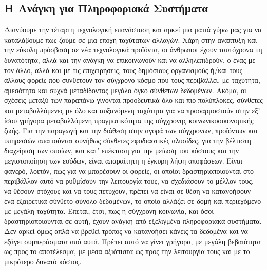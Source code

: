\documentclass{article}
\begin{document}
\subsection{Η Ανάγκη για Πληροφοριακά Συστήματα}
Διανύουμε την τέταρτη τεχνολογική επανάσταση και αρκεί μια ματιά γύρω μας για να καταλάβουμε πως ζούμε σε μια εποχή ταχύτατων αλλαγών. Χάρη στην ανάπτυξη και την εύκολη πρόσβαση σε νέα τεχνολογικά προϊόντα, οι άνθρωποι έχουν ταυτόχρονα τη δυνατότητα, αλλά και την ανάγκη να επικοινωνούν και να αλληλεπιδρούν, ο ένας με τον άλλο, αλλά και με τις επιχειρήσεις, τους δημόσιους οργανισμούς ή/και τους άλλους φορείς που συνθέτουν τον σύγχρονο κόσμο που τους περιβάλλει, με ταχύτητα, αμεσότητα και συχνά μεταδίδοντας μεγάλο όγκο σύνθετων δεδομένων. Ακόμα, οι σχέσεις μεταξύ των παραπάνω γίνονται προοδευτικά όλο και πιο πολύπλοκες, σύνθετες και μεταβαλλόμενες με όλο και αυξανόμενη ταχύτητα για να προσαρμοστούν στην εξ’ ίσου γρήγορα μεταβαλλόμενη πραγματικότητα της σύγχρονης κοινωνικοοικονομικής ζωής. Για την παραγωγή και την διάθεση στην αγορά των σύγχρονων, προϊόντων και υπηρεσιών απαιτούνται συνήθως σύνθετες εφοδιαστικές αλυσίδες, για την βέλτιστη διαχείριση των οποίων, και κατ’ επέκταση για την μείωση του κόστους και την μεγιστοποίηση των εσόδων, είναι απαραίτητη η έγκυρη λήψη αποφάσεων. Είναι φανερό, λοιπόν, πως για να μπορέσουν οι φορείς, οι οποίοι δραστηριοποιούνται στο περιβάλλον αυτό να ρυθμίσουν την λειτουργία τους, να σχεδιάσουν το μέλλον τους, να θέσουν στόχους και να τους πετύχουν, πρέπει να  είναι σε θέση να κατανοήσουν ένα εξαιρετικά σύνθετο σύνολο δεδομένων, το οποίο αλλάζει σε δομή και περιεχόμενο με μεγάλη ταχύτητα.
Έπεται, έτσι, πως η σύγχρονη κοινωνία, και όσοι δραστηριοποιούνται σε αυτή, έχουν ανάγκη από εξελιγμένα πληροφοριακά συστήματα.
Δεν αρκεί όμως απλά  να βρεθεί τρόπος να κατανοήσει κάνεις τα δεδομένα και να εξάγει συμπεράσματα από αυτά. Πρέπει αυτό να γίνει γρήγορα, με μεγάλη βεβαιότητα ως προς το αποτέλεσμα, με μέσα αξιόπιστα ως προς την λειτουργία τους και με το μικρότερο δυνατό κόστος.
\end{document}
